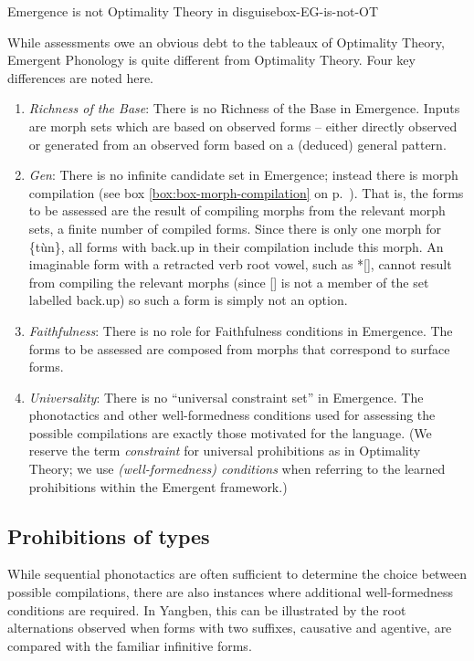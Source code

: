 \begin{dadpbox}{Emergence is not Optimality Theory in disguise}{box-EG-is-not-OT}

While assessments owe an obvious debt to the tableaux of Optimality Theory, Emergent Phonology is  quite different from Optimality Theory. Four key differences  are noted here.  
\begin{enumerate}
\item {\itshape Richness of the Base}: There is no Richness of the Base in Emergence. Inputs are morph sets which are based on observed forms -- either directly observed or generated from an observed form based on a (deduced) general pattern. 
\item {\itshape Gen}: There is no infinite candidate set in Emergence; instead there is  morph compilation (see box \ref{box:box-morph-compilation}  on p.\ \pageref{box:box-morph-compilation}). That is, the forms to be assessed are the result of compiling morphs from the relevant morph sets, a finite number of compiled forms. Since there is only one morph for \{tùn\}, all forms with {\sc back.up} in their compilation include this morph. An imaginable form with a retracted verb root vowel, such as *[], cannot result from compiling the relevant morphs (since [] is not a member of the set labelled {\sc back.up}) so such a form is simply not an option.

\item {\itshape Faithfulness}: There is no role for Faithfulness conditions in Emergence. The forms to be assessed are composed from morphs that correspond to surface forms.
\item {\itshape Universality}: There is no ``universal constraint set'' in Emergence. The phonotactics and other well-formedness conditions used  for assessing the possible compilations are exactly those motivated for the language. (We reserve the term \textit{constraint} for  universal prohibitions as in Optimality Theory; we use \textit{(well-formedness) conditions} when referring to the learned prohibitions within the Emergent framework.)
\end{enumerate}
\end{dadpbox}

\subsection{Prohibitions of types}\label{section_defaults}\label{section_types}
While sequential phonotactics are often sufficient to determine the choice between possible compilations, there are also instances where additional well-form\-ed\-ness conditions are required. In Yangben, this can be illustrated by the  root alternations observed when forms with two suffixes,   {\sc causative} and {\sc agentive}, are compared with the familiar infinitive forms. 



